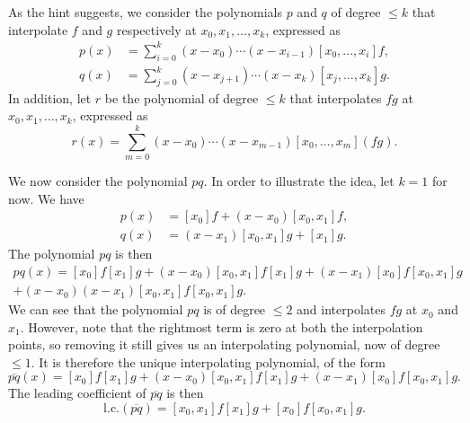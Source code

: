 \begin{solution}
    As the hint suggests, we consider the polynomials $p$ and $q$ of degree $\leq k$ that interpolate $f$ and $g$ respectively at $x_0, x_1, \ldots, x_k$, expressed as
    \begin{align*}
        p(x) &= \sum_{i=0}^{k} (x - x_0) \cdots (x - x_{i-1})[x_0, \ldots, x_i]f, \\
        q(x) &= \sum_{j=0}^{k} (x - x_{j+1}) \cdots (x - x_k)[x_j, \ldots, x_k]g.
    \end{align*}
    In addition, let $r$ be the polynomial of degree $\leq k$ that interpolates $fg$ at $x_0, x_1, \ldots, x_k$, expressed as
    \begin{equation*}
        r(x) = \sum_{m=0}^{k} (x - x_0) \cdots (x - x_{m-1})[x_0, \ldots, x_m](fg).
    \end{equation*}

    We now consider the polynomial $pq$.
    In order to illustrate the idea, let $k = 1$ for now.
    We have
    \begin{align*}
        p(x) &= [x_0]f + (x - x_0)[x_0, x_1]f, \\
        q(x) &= (x - x_1)[x_0, x_1]g + [x_1]g.
    \end{align*}
    The polynomial $pq$ is then
    \begin{multline*}
        pq(x)
        = [x_0]f [x_1]g
        + (x - x_0)[x_0, x_1]f [x_1]g
        + (x - x_1)[x_0]f [x_0, x_1]g \\
        + (x - x_0)(x - x_1)[x_0, x_1]f [x_0, x_1]g.
    \end{multline*}
    We can see that the polynomial $pq$ is of degree $\leq 2$ and interpolates $fg$ at $x_0$ and $x_1$.
    However, note that the rightmost term is zero at both the interpolation points, so removing it still gives us an interpolating polynomial, now of degree $\leq 1$.
    It is therefore the unique interpolating polynomial, of the form
    \begin{equation*}
        \overline{pq}(x)
        = [x_0]f [x_1]g
        + (x - x_0)[x_0, x_1]f [x_1]g
        + (x - x_1)[x_0]f [x_0, x_1]g.
    \end{equation*}
    The leading coefficient of $\overline{pq}$ is then
    \begin{equation*}
        \text{l.c.}(\overline{pq}) = [x_0, x_1]f [x_1]g + [x_0]f [x_0, x_1]g.
    \end{equation*}


\end{solution}
